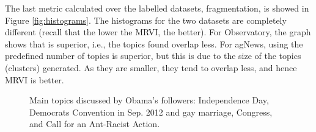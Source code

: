 The last metric calculated over the labelled datasets, fragmentation, is showed in Figure \ref{fig:histograms}. The histograms for the two datasets are completely different (recall that the lower the MRVI, the better). For Observatory, the graph shows that  is superior, i.e., the topics found overlap less. For agNews, \method using the predefined number of topics is superior, but this is due to the size of the topics (clusters) generated. As they are smaller, they tend to overlap less, and hence MRVI is better. 

\begin{figure}[!tb]
 \centering
{}
 \caption{Main topics discussed by Obama's followers: Independence Day, Democrats Convention in Sep. 2012 and gay marriage, Congress, and Call for an Ant-Racist Action.}
 \label{fig:election}
  \end{figure}

